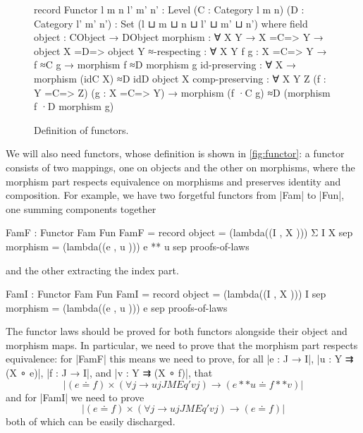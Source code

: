 \begin{figure}
\begin{code}
record Functor
  {l m n l' m' n' : Level}
  (C : Category {l} {m} {n}) (D : Category {l'} {m'} {n'}) :
  Set (l ⊔ m ⊔ n ⊔ l' ⊔ m' ⊔ n') where
  field
    object    :  CObject → DObject
    morphism  :  ∀ {X Y} → X =C=> Y → object X =D=> object Y
    ≈-respecting :
      ∀ {X Y} {f g : X =C=> Y} →
      f ≈C g → morphism f ≈D morphism g
    id-preserving :
      ∀ {X} → morphism (idC {X}) ≈D idD {object X}
    comp-preserving :
      ∀ {X Y Z} (f : Y =C=> Z) (g : X =C=> Y) →
      morphism (f ·C g) ≈D (morphism f ·D morphism g)
\end{code}
\caption{Definition of functors.}
\label{fig:functor}
\end{figure}

We will also need functors, whose definition is shown in \autoref{fig:functor}: a functor consists of two mappings, one on objects and the other on morphisms, where the morphism part respects equivalence on morphisms and preserves identity and composition.
For example, we have two forgetful functors from |Fam| to |Fun|, one summing components together
\begin{code}
FamF : Functor Fam Fun
FamF = record  {    object    =  (lambda((I  ,  X  )))  Σ I X
               sep  morphism  =  (lambda((e  ,  u  )))  e ** u
               sep  proofs-of-laws }
\end{code}
and the other extracting the index part.
\begin{code}
FamI : Functor Fam Fun
FamI = record  {    object    =  (lambda((I  ,  X  )))  I
               sep  morphism  =  (lambda((e  ,  u  )))  e
               sep  proofs-of-laws }
\end{code}
The functor laws should be proved for both functors alongside their object and morphism maps.
In particular, we need to prove that the morphism part respects equivalence: for |FamF| this means we need to prove, for all |e : J → I|, |u : Y ⇉ (X ∘ e)|, |f : J → I|, and |v : Y ⇉ (X ∘ f)|, that
\[ |(e ≐ f) × (∀ {j} → u {j} JMEq' v {j}) → (e ** u ≐ f ** v)| \]
and for |FamI| we need to prove
\[ |(e ≐ f) × (∀ {j} → u {j} JMEq' v {j}) → (e ≐ f)| \]
both of which can be easily discharged.


